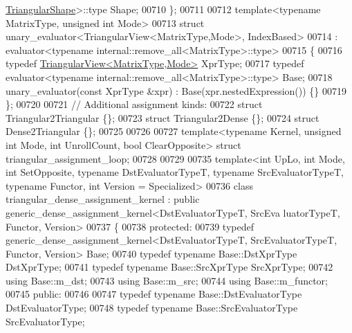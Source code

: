 \begin{DoxyCode}
      \hyperlink{struct_eigen_1_1_triangular_shape}{TriangularShape}>::type Shape;
00710 \};
00711 
00712 \textcolor{keyword}{template}<\textcolor{keyword}{typename} MatrixType, \textcolor{keywordtype}{unsigned} \textcolor{keywordtype}{int} Mode>
00713 \textcolor{keyword}{struct }unary\_evaluator<TriangularView<MatrixType,Mode>, IndexBased>
00714  : evaluator<typename internal::remove\_all<MatrixType>::type>
00715 \{
00716   \textcolor{keyword}{typedef} \hyperlink{group___core___module_class_eigen_1_1_triangular_view}{TriangularView<MatrixType,Mode>} XprType;
00717   \textcolor{keyword}{typedef} evaluator<typename internal::remove\_all<MatrixType>::type> Base;
00718   unary\_evaluator(\textcolor{keyword}{const} XprType &xpr) : Base(xpr.nestedExpression()) \{\}
00719 \};
00720 
00721 \textcolor{comment}{// Additional assignment kinds:}
00722 \textcolor{keyword}{struct }Triangular2Triangular    \{\};
00723 \textcolor{keyword}{struct }Triangular2Dense         \{\};
00724 \textcolor{keyword}{struct }Dense2Triangular         \{\};
00725 
00726 
00727 \textcolor{keyword}{template}<\textcolor{keyword}{typename} Kernel, \textcolor{keywordtype}{unsigned} \textcolor{keywordtype}{int} Mode, \textcolor{keywordtype}{int} UnrollCount, \textcolor{keywordtype}{bool} ClearOpposite> \textcolor{keyword}{struct }
      triangular\_assignment\_loop;
00728 
00729  
00735 \textcolor{keyword}{template}<\textcolor{keywordtype}{int} UpLo, \textcolor{keywordtype}{int} Mode, \textcolor{keywordtype}{int} SetOpposite, \textcolor{keyword}{typename} DstEvaluatorTypeT, \textcolor{keyword}{typename} SrcEvaluatorTypeT, \textcolor{keyword}{
      typename} Functor, \textcolor{keywordtype}{int} Version = Specialized>
00736 \textcolor{keyword}{class }triangular\_dense\_assignment\_kernel : \textcolor{keyword}{public} generic\_dense\_assignment\_kernel<DstEvaluatorTypeT, SrcEva
      luatorTypeT, Functor, Version>
00737 \{
00738 \textcolor{keyword}{protected}:
00739   \textcolor{keyword}{typedef} generic\_dense\_assignment\_kernel<DstEvaluatorTypeT, SrcEvaluatorTypeT, Functor, Version> Base;
00740   \textcolor{keyword}{typedef} \textcolor{keyword}{typename} Base::DstXprType DstXprType;
00741   \textcolor{keyword}{typedef} \textcolor{keyword}{typename} Base::SrcXprType SrcXprType;
00742   \textcolor{keyword}{using} Base::m\_dst;
00743   \textcolor{keyword}{using} Base::m\_src;
00744   \textcolor{keyword}{using} Base::m\_functor;
00745 \textcolor{keyword}{public}:
00746   
00747   \textcolor{keyword}{typedef} \textcolor{keyword}{typename} Base::DstEvaluatorType DstEvaluatorType;
00748   \textcolor{keyword}{typedef} \textcolor{keyword}{typename} Base::SrcEvaluatorType SrcEvaluatorType;

\end{DoxyCode}
